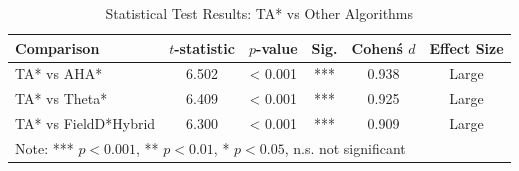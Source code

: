 \begin{table}[htbp]
\centering
\caption{Statistical Test Results: TA* vs Other Algorithms}
\label{tab:statistical_tests}
\begin{tabular}{lccccc}
\hline
Comparison & $t$-statistic & $p$-value & Sig. & Cohen\'s $d$ & Effect Size \\
\hline
TA* vs AHA* & 6.502 & < 0.001 & *** & 0.938 & Large \\
TA* vs Theta* & 6.409 & < 0.001 & *** & 0.925 & Large \\
TA* vs FieldD*Hybrid & 6.300 & < 0.001 & *** & 0.909 & Large \\
\hline
\multicolumn{6}{l}{\footnotesize Note: *** $p < 0.001$, ** $p < 0.01$, * $p < 0.05$, n.s. not significant} \\
\end{tabular}
\end{table}